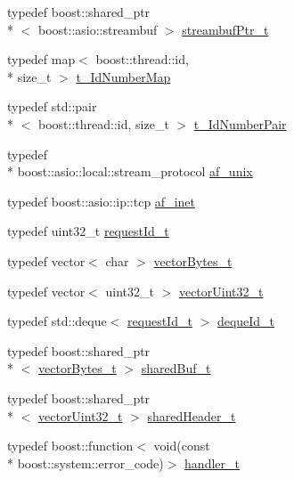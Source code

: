 \begin{DoxyCompactItemize}
typedef boost\-::shared\-\_\-ptr\\*
$<$ boost\-::asio\-::streambuf $>$ \hyperlink{namespacextd_1_1network_1_1utils_aaaf1b50be1864a40d85efd18979631e1}{streambuf\-Ptr\-\_\-t}
\item 
typedef map$<$ boost\-::thread\-::id, \\*
size\-\_\-t $>$ \hyperlink{namespacextd_1_1network_1_1utils_a778bf7884b2296561ffc1fc5a5f14e38}{t\-\_\-\-Id\-Number\-Map}
\item 
typedef std\-::pair\\*
$<$ boost\-::thread\-::id, size\-\_\-t $>$ \hyperlink{namespacextd_1_1network_1_1utils_aa6bd02256b6023347de116a773dd9500}{t\-\_\-\-Id\-Number\-Pair}
\item 
typedef \\*
boost\-::asio\-::local\-::stream\-\_\-protocol \hyperlink{namespacextd_1_1network_1_1utils_a60e83921a2d026f07b49fa094988acdf}{af\-\_\-unix}
\item 
typedef boost\-::asio\-::ip\-::tcp \hyperlink{namespacextd_1_1network_1_1utils_a6238bab7a616eda8c9424721444a18d1}{af\-\_\-inet}
\item 
typedef uint32\-\_\-t \hyperlink{namespacextd_1_1network_1_1utils_a0bdb4094852a77df867e219999175200}{request\-Id\-\_\-t}
\item 
typedef vector$<$ char $>$ \hyperlink{namespacextd_1_1network_1_1utils_a9fedf0d18549b8034e9ae347955e9a9a}{vector\-Bytes\-\_\-t}
\item 
typedef vector$<$ uint32\-\_\-t $>$ \hyperlink{namespacextd_1_1network_1_1utils_a2b135df55039cd8024b40ef3e1817681}{vector\-Uint32\-\_\-t}
\item 
typedef std\-::deque$<$ \hyperlink{namespacextd_1_1network_1_1utils_a0bdb4094852a77df867e219999175200}{request\-Id\-\_\-t} $>$ \hyperlink{namespacextd_1_1network_1_1utils_ac3ca189267ad1167fa141608f8b3a2de}{deque\-Id\-\_\-t}
\item 
typedef boost\-::shared\-\_\-ptr\\*
$<$ \hyperlink{namespacextd_1_1network_1_1utils_a9fedf0d18549b8034e9ae347955e9a9a}{vector\-Bytes\-\_\-t} $>$ \hyperlink{namespacextd_1_1network_1_1utils_a92b366b7e2a1ab09ac4f4a0401f8fb84}{shared\-Buf\-\_\-t}
\item 
typedef boost\-::shared\-\_\-ptr\\*
$<$ \hyperlink{namespacextd_1_1network_1_1utils_a2b135df55039cd8024b40ef3e1817681}{vector\-Uint32\-\_\-t} $>$ \hyperlink{namespacextd_1_1network_1_1utils_af5b287652a0fd8fca54642f8d3ca07fa}{shared\-Header\-\_\-t}
\item 
typedef boost\-::function$<$ void(const \\*
boost\-::system\-::error\-\_\-code)$>$ \hyperlink{namespacextd_1_1network_1_1utils_ac8a6f796cd645f83cde023d163665bb5}{handler\-\_\-t}
\end{DoxyCompactItemize}
